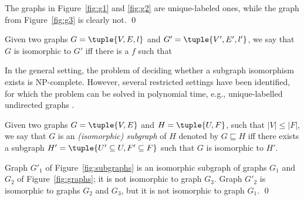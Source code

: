 \begin{example}
    The graphs in Figure~\ref{fig:g1} and \ref{fig:g2} are unique-labeled ones, while the graph from Figure~\ref{fig:g3} is clearly not. \qed
\end{example}



\begin{definition}\label{def:isom}
    Given two graphs $G=\tuple{V,E,l}$ and $G'=\tuple{V',E',l'}$, we say that $G$ is isomorphic to $G'$ iff there is a  $f$ such that 
\end{definition}



In the general setting, the problem of deciding whether a subgraph isomorphism exists is NP-complete. However, several restricted settings have been identified, for which the problem can be solved in polynomial time, e.g., unique-labelled undirected graphs \parencite{DBLP:journals/corr/abs-1709-00900}.

\begin{definition}\label{def:subgraph}
    Given two graphs $G = \tuple{V,E}$ and $H=\tuple{U, F}$, such that $|V|\leq |F|$, we say that $G$ is an \emph{(isomorphic) subgraph} of $H$  denoted by $G \sqsubseteq H$ iff there exists a subgraph $H' = \tuple{U'\subseteq U, F'\subseteq F}$ such that $G$ is isomorphic to $H'$.
\end{definition}

\begin{example}
    Graph $G'_1$ of Figure~\ref{fig:subgraphs} is an isomorphic subgraph of graphs $G_1$ and $G_2$ of Figure~\ref{fig:graphs}; it is not isomorphic to graph $G_3$. Graph $G'_2$ is isomorphic to graphs $G_2$ and $G_3$, but it is not isomorphic to graph $G_1$.  \qed
\end{example}

